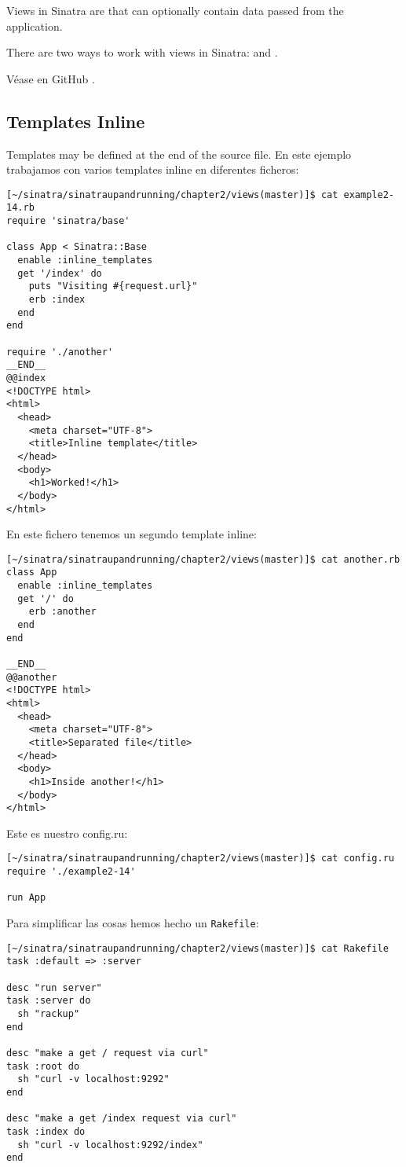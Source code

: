 Views in Sinatra  are  that can optionally contain data
passed from the application.

There are two ways to work with views in Sinatra:  and
.

Véase en GitHub 
.

\subsection{Templates Inline}

Templates may be defined at the end of the source file.
En este ejemplo trabajamos con varios templates inline en diferentes ficheros:
\begin{verbatim}
[~/sinatra/sinatraupandrunning/chapter2/views(master)]$ cat example2-14.rb 
require 'sinatra/base'

class App < Sinatra::Base
  enable :inline_templates
  get '/index' do 
    puts "Visiting #{request.url}"
    erb :index
  end
end

require './another'
__END__
@@index
<!DOCTYPE html>
<html> 
  <head>
    <meta charset="UTF-8">
    <title>Inline template</title> 
  </head>
  <body> 
    <h1>Worked!</h1>
  </body> 
</html>
\end{verbatim}

En este fichero tenemos un segundo template inline:
\begin{verbatim}
[~/sinatra/sinatraupandrunning/chapter2/views(master)]$ cat another.rb 
class App 
  enable :inline_templates
  get '/' do
    erb :another
  end
end

__END__
@@another
<!DOCTYPE html>
<html> 
  <head>
    <meta charset="UTF-8">
    <title>Separated file</title> 
  </head>
  <body> 
    <h1>Inside another!</h1>
  </body> 
</html>
\end{verbatim}

Este es nuestro config.ru:

\begin{verbatim}
[~/sinatra/sinatraupandrunning/chapter2/views(master)]$ cat config.ru 
require './example2-14'

run App
\end{verbatim}
Para simplificar las cosas hemos hecho un \verb|Rakefile|:
\begin{verbatim}
[~/sinatra/sinatraupandrunning/chapter2/views(master)]$ cat Rakefile 
task :default => :server

desc "run server"
task :server do
  sh "rackup"
end

desc "make a get / request via curl"
task :root do
  sh "curl -v localhost:9292"
end

desc "make a get /index request via curl"
task :index do 
  sh "curl -v localhost:9292/index"
end
\end{verbatim}

